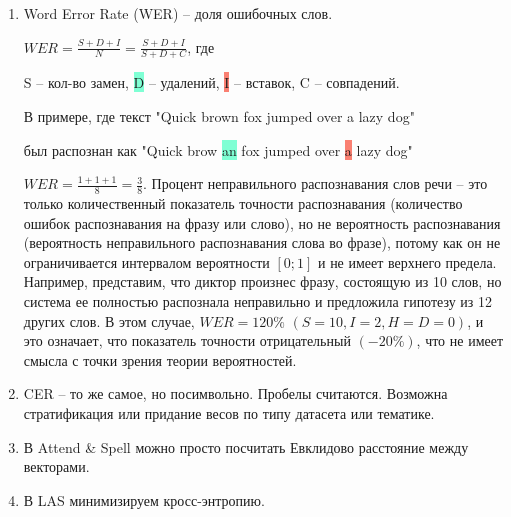 \begin{enumerate}
    \item Word Error Rate (WER) -- доля ошибочных слов. 
    
    $WER = \frac{S+D+I}{N}=\frac{S+D+I}{S+D+C}$, где 
    
    \colorbox{Apricot}{S} -- кол-во замен, \colorbox{Aquamarine}{D} -- удалений, \colorbox{Salmon}{I} -- вставок, C -- совпадений.
    
    В примере, где текст "Quick brown fox jumped over a lazy dog" 
    
    был распознан как "Quick \colorbox{Apricot}{brow} \colorbox{Aquamarine}{an} fox jumped over \colorbox{Salmon}{a} lazy dog" 
    
    $WER = \frac{1+1+1}{8}=\frac{3}{8}$. Процент неправильного распознавания слов речи – это только количественный показатель точности распознавания (количество ошибок распознавания на фразу или слово), но не вероятность распознавания (вероятность неправильного распознавания слова во фразе), потому как он не ограничивается интервалом вероятности $[0; 1]$ и не имеет верхнего предела. Например, представим, что диктор произнес фразу, состоящую из 10 слов, но система ее полностью распознала неправильно и предложила гипотезу из 12 других слов. В этом случае, $WER=120 \%$ $(S=10, I=2, H=D=0)$, и это означает, что показатель точности отрицательный $(-20\%)$, что не имеет смысла с точки зрения теории вероятностей.
    \item CER -- то же самое, но посимвольно. Пробелы считаются. Возможна стратификация или придание весов по типу датасета или тематике.
    \item В Attend \& Spell можно просто посчитать Евклидово расстояние между векторами.
    \item В LAS минимизируем кросс-энтропию.
\end{enumerate}
